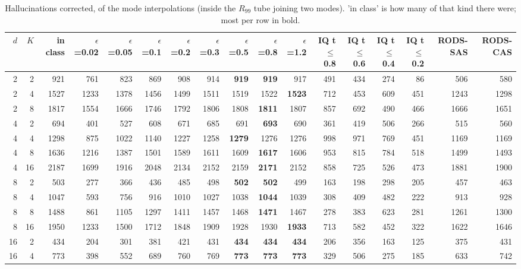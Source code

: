 \begin{table}[t]
\centering
\caption{Hallucinations corrected, of the mode interpolations (inside the $R_{99}$ tube joining two modes). 'in class' is how many of that kind there were; most per row in bold.}
\label{tab:hall-interp}
\begin{tabular}{rr r rrrrrrrrrrrrrr}
\toprule
$d$ & $K$ & in class & $\epsilon$=0.02 & $\epsilon$=0.05 & $\epsilon$=0.1 & $\epsilon$=0.2 & $\epsilon$=0.3 & $\epsilon$=0.5 & $\epsilon$=0.8 & $\epsilon$=1.2 & IQ t$\le$0.8 & IQ t$\le$0.6 & IQ t$\le$0.4 & IQ t$\le$0.2 & RODS-SAS & RODS-CAS \\
\midrule
2 & 2 & 921 & 761 & 823 & 869 & 908 & 914 & \textbf{919} & \textbf{919} & 917 & 491 & 434 & 274 & 86 & 506 & 580 \\
2 & 4 & 1527 & 1233 & 1378 & 1456 & 1499 & 1511 & 1519 & 1522 & \textbf{1523} & 712 & 453 & 609 & 451 & 1243 & 1298 \\
2 & 8 & 1817 & 1554 & 1666 & 1746 & 1792 & 1806 & 1808 & \textbf{1811} & 1807 & 857 & 692 & 490 & 466 & 1666 & 1651 \\
\midrule
4 & 2 & 694 & 401 & 527 & 608 & 671 & 685 & 691 & \textbf{693} & 690 & 361 & 419 & 506 & 266 & 515 & 560 \\
4 & 4 & 1298 & 875 & 1022 & 1140 & 1227 & 1258 & \textbf{1279} & 1276 & 1276 & 998 & 971 & 769 & 451 & 1169 & 1169 \\
4 & 8 & 1636 & 1216 & 1387 & 1501 & 1589 & 1611 & 1609 & \textbf{1617} & 1606 & 953 & 815 & 784 & 518 & 1499 & 1493 \\
4 & 16 & 2187 & 1699 & 1916 & 2048 & 2134 & 2152 & 2159 & \textbf{2171} & 2152 & 858 & 725 & 526 & 473 & 1881 & 1900 \\
\midrule
8 & 2 & 503 & 277 & 366 & 436 & 485 & 498 & \textbf{502} & \textbf{502} & 499 & 163 & 198 & 298 & 205 & 457 & 463 \\
8 & 4 & 1047 & 593 & 756 & 916 & 1010 & 1027 & 1038 & \textbf{1044} & 1039 & 308 & 409 & 482 & 222 & 913 & 928 \\
8 & 8 & 1488 & 861 & 1105 & 1297 & 1411 & 1457 & 1468 & \textbf{1471} & 1467 & 278 & 383 & 623 & 281 & 1261 & 1300 \\
8 & 16 & 1950 & 1233 & 1500 & 1712 & 1848 & 1909 & 1928 & 1930 & \textbf{1933} & 713 & 582 & 452 & 322 & 1622 & 1646 \\
\midrule
16 & 2 & 434 & 204 & 301 & 381 & 421 & 431 & \textbf{434} & \textbf{434} & \textbf{434} & 206 & 356 & 163 & 125 & 375 & 431 \\
16 & 4 & 773 & 398 & 552 & 689 & 760 & 769 & \textbf{773} & \textbf{773} & \textbf{773} & 329 & 506 & 275 & 185 & 633 & 742 \\

\end{tabular}
\end{table}
